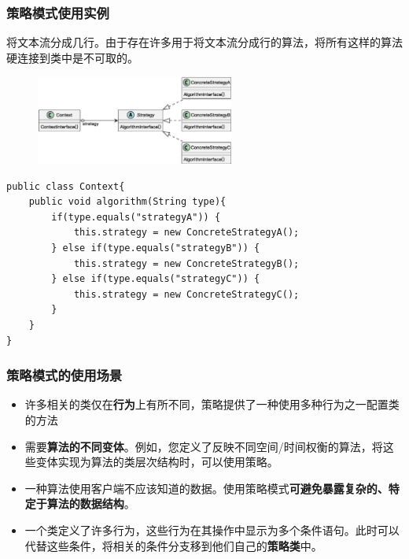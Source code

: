 \subsubsection{策略模式使用实例}
将文本流分成几行。由于存在许多用于将文本流分成行的算法，将所有这样的算法硬连接到类中是不可取的。
\begin{figure}[H]
    \vspace{-0.5em}
	\centering
	\includegraphics[width=0.58\textwidth]{images/策略模式.eps}
    \vspace{-1em}
\end{figure}


\begin{lstlisting}
public class Context{
    public void algorithm(String type){
        if(type.equals("strategyA")) {
            this.strategy = new ConcreteStrategyA();
        } else if(type.equals("strategyB")) {
            this.strategy = new ConcreteStrategyB();
        } else if(type.equals("strategyC")) {
            this.strategy = new ConcreteStrategyC();
        }
    }
}
\end{lstlisting}

\subsubsection{策略模式的使用场景}
\begin{itemize}
    \item 许多相关的类仅在\textbf{行为}上有所不同，策略提供了一种使用多种行为之一配置类的方法
    \item 需要\textbf{算法的不同变体}。例如，您定义了反映不同空间/时间权衡的算法，将这些变体实现为算法的类层次结构时，可以使用策略。
    \item 一种算法使用客户端不应该知道的数据。使用策略模式\textbf{可避免暴露复杂的、特定于算法的数据结构}。
    \item 一个类定义了许多行为，这些行为在其操作中显示为多个条件语句。此时可以代替这些条件，将相关的条件分支移到他们自己的\textbf{策略类}中。
\end{itemize}

